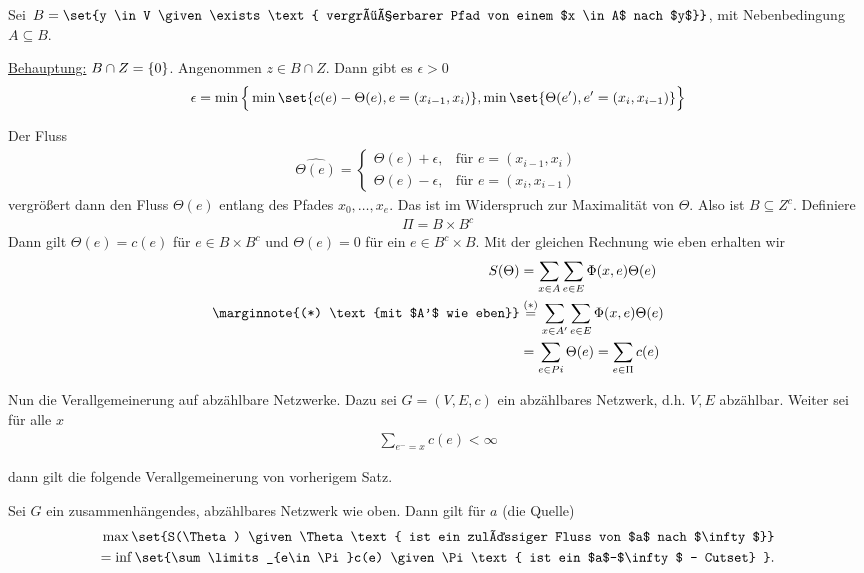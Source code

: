 \begin{beweis}
	Sei $B= \set{y \in V \given \exists \text{ vergrößerbarer Pfad von einem $x \in A$ nach $y$}}$, mit Nebenbedingung $A\subseteq B$.
	
	\underline{Behauptung:} $B \cap Z = \{0\}$. Angenommen $z \in B \cap Z$. Dann gibt es $\epsilon > 0$
	\begin{align}
		\epsilon = \min\Big\{\min\set{c(e) -\Theta(e), e = (x_{i-1},x_i)}, \min\set{\Theta(e'), e' = (x_i,x_{i-1})}\Big\}
	\end{align}
	
	Der Fluss \begin{align}
		\hat{\Theta(e)} = 
			\begin{cases}
				\Theta(e) + \epsilon, & \text{für } e = (x_{i-1},x_i)\\
 				\Theta(e) - \epsilon, & \text{für } e = (x_i,x_{i-1})
			\end{cases}
	\end{align}
	vergrößert dann den Fluss $\Theta(e)$ entlang des Pfades $x_0, \dots, x_e$. Das ist im Widerspruch zur Maximalität von $\Theta$. Also ist $B \subseteq Z^c$. Definiere
	\begin{align}
		\Pi = B \times B^c%
	\end{align} 
	Dann gilt $\Theta(e) = c(e)$ für $e \in B \times B^c$ und $\Theta(e) = 0$ für ein $e \in B^c \times B$. Mit der gleichen Rechnung wie eben erhalten wir 
	\begin{align} 
		S(\Theta) &= \sum\limits_{x\in A} \sum\limits_{e \in E} \Phi(x,e) \Theta(e)\\ \marginnote{(*) \text{mit $A'$ wie eben}}
				&\overset{(*)}{=} \sum\limits_{x \in A'} \sum\limits_{e \in E} \Phi(x,e) \Theta(e) \\
				&= \sum\limits_{e \in Pi}\Theta(e) = \sum\limits_{e \in \Pi}c(e) 
	\end{align}
\end{beweis}
Nun die Verallgemeinerung auf abzählbare Netzwerke. Dazu sei $G= (V,E,c)$ ein abzählbares Netzwerk, d.h. $V,E$ abzählbar. Weiter sei für alle $x$ 
\begin{align}
	\sum\limits_{e ^- = x} c(e) < \infty
\end{align}

dann gilt die folgende Verallgemeinerung von  vorherigem Satz. 

\begin{satz}
	Sei $G$ ein zusammenhängendes, abzählbares Netzwerk wie oben. Dann gilt für $a$ (die Quelle)
	\begin{align}
		\max\set{S(\Theta) \given \Theta \text{ ist ein zulässiger Fluss von $a$ nach $\infty$}} \\
		=\inf\set{\sum\limits_{e\in\Pi}c(e) \given \Pi \text{ ist ein $a$--$\infty$ -- Cutset} }.
	\end{align}
\end{satz}

